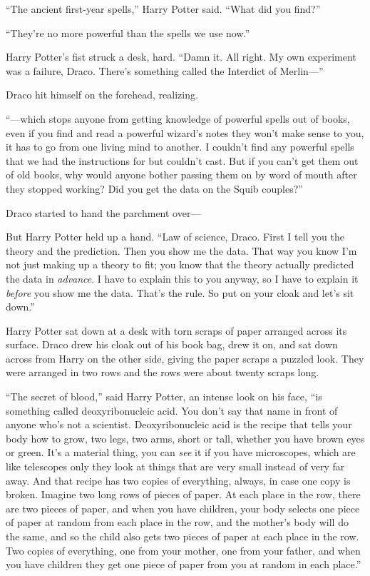 “The ancient first-year spells,” Harry Potter said. “What did you find?”

“They’re no more powerful than the spells we use now.”

Harry Potter’s fist struck a desk, hard. “Damn it. All right. My own experiment was a failure, Draco. There’s something called the Interdict of Merlin—”

Draco hit himself on the forehead, realizing.

“—which stops anyone from getting knowledge of powerful spells out of books, even if you find and read a powerful wizard’s notes they won’t make sense to you, it has to go from one living mind to another. I couldn’t find any powerful spells that we had the instructions for but couldn’t cast. But if you can’t get them out of old books, why would anyone bother passing them on by word of mouth after they stopped working? Did you get the data on the Squib couples?”

Draco started to hand the parchment over—

But Harry Potter held up a hand. “Law of science, Draco. First I tell you the theory and the prediction. Then you show me the data. That way you know I’m not just making up a theory to fit; you know that the theory actually predicted the data in \emph{advance}. I have to explain this to you anyway, so I have to explain it \emph{before} you show me the data. That’s the rule. So put on your cloak and let’s sit down.”

Harry Potter sat down at a desk with torn scraps of paper arranged across its surface. Draco drew his cloak out of his book bag, drew it on, and sat down across from Harry on the other side, giving the paper scraps a puzzled look. They were arranged in two rows and the rows were about twenty scraps long.

“The secret of blood,” said Harry Potter, an intense look on his face, “is something called deoxyribonucleic acid. You don’t say that name in front of anyone who’s not a scientist. Deoxyribonucleic acid is the recipe that tells your body how to grow, two legs, two arms, short or tall, whether you have brown eyes or green. It’s a material thing, you can \emph{see} it if you have microscopes, which are like telescopes only they look at things that are very small instead of very far away. And that recipe has two copies of everything, always, in case one copy is broken. Imagine two long rows of pieces of paper. At each place in the row, there are two pieces of paper, and when you have children, your body selects one piece of paper at random from each place in the row, and the mother’s body will do the same, and so the child also gets two pieces of paper at each place in the row. Two copies of everything, one from your mother, one from your father, and when you have children they get one piece of paper from you at random in each place.”

